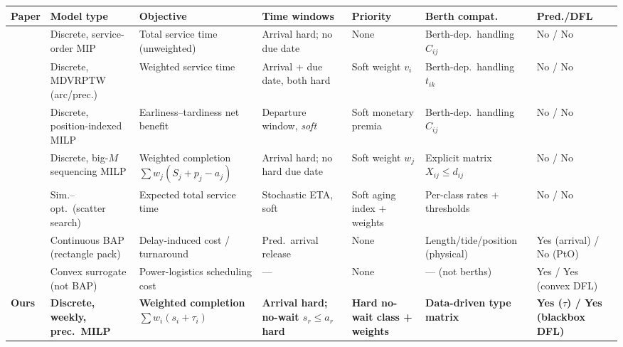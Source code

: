 \begin{table}[t]
\centering
\small
\setlength{\tabcolsep}{4pt}
\renewcommand{\arraystretch}{1.2}
\begin{tabular}{@{}p{2.7cm} p{2.3cm} p{2.4cm} p{2.2cm} p{2.0cm} p{2.3cm} p{1.6cm}@{}}
\toprule
\textbf{Paper} & \textbf{Model type} & \textbf{Objective} & \textbf{Time windows} & \textbf{Priority} & \textbf{Berth compat.} & \textbf{Pred./DFL} \\
\midrule
\citet{imai2001dynamic}            & Discrete, service-order MIP        & Total service time (unweighted)        & Arrival hard; no due date        & None                         & Berth-dep.\ handling $C_{ij}$         & No / No \\
\citet{cordeau2005berth}           & Discrete, MDVRPTW (arc/prec.)      & Weighted service time                  & Arrival + due date, both hard    & Soft weight $v_i$            & Berth-dep.\ handling $t_{ik}$         & No / No \\
\citet{golias2007berth}            & Discrete, position-indexed MILP    & Earliness--tardiness net benefit       & Departure window, \emph{soft}    & Soft monetary premia         & Berth-dep.\ handling $C_{ij}$         & No / No \\
\citet{alzaabi2016berth}           & Discrete, big-$M$ sequencing MILP  & Weighted completion $\sum w_j(S_j{+}p_j{-}a_j)$ & Arrival hard; no hard due date & Soft weight $w_j$         & Explicit matrix $X_{ij}\le d_{ij}$    & No / No \\
\citet{Ursavas2022PriorityControlBAP} & Sim.--opt.\ (scatter search)    & Expected total service time            & Stochastic ETA, soft             & Soft aging index + weights   & Per-class rates + thresholds          & No / No \\
\citet{chu2025integrating}         & Continuous BAP (rectangle pack)    & Delay-induced cost / turnaround        & Pred.\ arrival release           & None                         & Length/tide/position (physical)       & Yes (arrival) / No (PtO) \\
\citet{pu2025predictthenoptimize}  & Convex surrogate (not BAP)         & Power-logistics scheduling cost        & ---                              & None                         & --- (not berths)                      & Yes / Yes (convex DFL) \\
\midrule
\textbf{Ours}                      & \textbf{Discrete, weekly, prec.\ MILP} & \textbf{Weighted completion $\sum w_i(s_i{+}\tau_i)$} & \textbf{Arrival hard; no-wait $s_r\le a_r$ hard} & \textbf{Hard no-wait class + weights} & \textbf{Data-driven type matrix} & \textbf{Yes ($\tau$) / Yes (blackbox DFL)} \\

\end{tabular}
\end{table}
